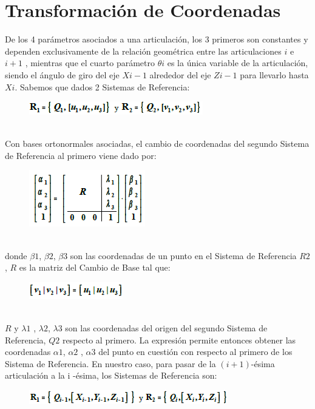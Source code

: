 \documentclass[11pt,a4paper,oldfontcommands,oneside]{memoir}
\begin{document}
\chapter{Transformación de Coordenadas}
De los 4 parámetros asociados a una articulación, los 3 primeros son constantes y dependen exclusivamente de la relación geométrica entre las articulaciones $i$ e $i+1$ , mientras que el cuarto parámetro $\theta i$ es la única variable de la articulación, siendo el ángulo de giro del eje $Xi-1$ alrededor del eje $Zi-1$ para llevarlo hasta $Xi$.
Sabemos que dados 2 Sistemas de Referencia:
\begin{figure}[h]
	\includegraphics[scale=1]{4.png}
	\label{4}
\end{figure}\\
Con bases ortonormales asociadas, el cambio de coordenadas del segundo Sistema de Referencia al primero viene dado por:
\begin{figure}[h]
	\includegraphics[scale=2]{5.png}
	\label{5}
\end{figure}\\
donde $\beta 1$, $\beta 2$, $\beta 3$ son las coordenadas de un punto en el Sistema de Referencia  $R2$ , $R$ es la matriz del Cambio de Base tal que:
\begin{figure}[h]
	\includegraphics[scale=1.35]{6.png}
	\label{6}
\end{figure}\\
$R$ y $\lambda 1$ , $\lambda 2$, $\lambda 3$ son las coordenadas del origen del segundo Sistema de Referencia, $Q2$ respecto al primero. La expresión permite entonces obtener las coordenadas $\alpha 1$, $\alpha 2$ , $\alpha 3$ del punto en cuestión con respecto al primero de los Sistema de Referencia.
En nuestro caso, para pasar de la $(i+1)$-ésima articulación a la i -ésima, los Sistemas de Referencia son:
\begin{figure}[h]
	\includegraphics[scale=1.5]{7.png}
	\label{7}
\end{figure}\\
\vspace{2cm}
\hfill
\end{document}
